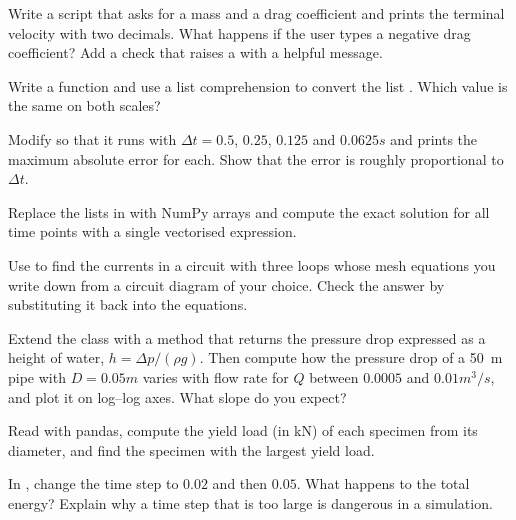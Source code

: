 \begin{exercises}
\item Write a script that asks for a mass and a drag coefficient and prints the terminal
  velocity with two decimals. What happens if the user types a negative drag coefficient?
  Add a check that raises a  with a helpful message.
\item Write a function  and use a list comprehension to
  convert the list \code{[-40, 0, 37, 100]}. Which value is the same on both scales?
\item Modify  so that it runs with $\Delta t = 0.5$, $0.25$, $0.125$ and
  $0.0625\unit{s}$ and prints the maximum absolute error for each. Show that the error is
  roughly proportional to $\Delta t$.
\item Replace the lists in  with NumPy arrays and compute the exact solution
  for all time points with a single vectorised expression.
\item Use  to find the currents in a circuit with three loops whose
  mesh equations you write down from a circuit diagram of your choice. Check the answer by
  substituting it back into the equations.
\item Extend the  class with a method  that returns the
  pressure drop expressed as a height of water, $h = \Delta p/(\rho g)$. Then compute how the
  pressure drop of a 50~m pipe with $D = 0.05\unit{m}$ varies with flow rate for $Q$ between
  $0.0005$ and $0.01\unit{m^3/s}$, and plot it on log--log axes. What slope do you expect?
\enlargethispage{2\baselineskip}
\item Read  with pandas, compute the yield load (in kN) of each specimen
  from its diameter, and find the specimen with the largest yield load.
\item In , change the time step to $0.02$ and then $0.05$. What happens to
  the total energy? Explain why a time step that is too large is dangerous in a
  simulation.
\end{exercises}
